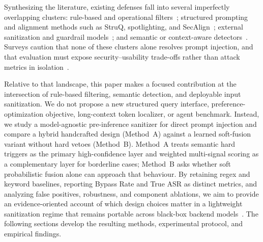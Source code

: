 Synthesizing the literature, existing defenses fall into several imperfectly overlapping clusters: rule-based and operational filters~\cite{openrouter2026promptinjection,getstream2024prompt,mend2024prompt}; structured prompting and alignment methods such as StruQ, spotlighting, and SecAlign~\cite{struq2024,hines2024spotlighting,secalign2024}; external sanitization and guardrail models~\cite{geng2025pisanitizer,shi2025promptarmor,chowdhury2025prepsilonepsilonmptsanitizingsensitiveprompts}; and semantic or context-aware detectors~\cite{wang2025promptsleuth,kholkar2025capture}.
Surveys caution that none of these clusters alone resolves prompt injection, and that evaluation must expose security--usability trade-offs rather than attack metrics in isolation~\cite{correia2026systematic,bair2025prompt,11359704,zizzo2025adversarial}.

Relative to that landscape, this paper makes a focused contribution at the intersection of rule-based filtering, semantic detection, and deployable input sanitization.
We do not propose a new structured query interface, preference-optimization objective, long-context token localizer, or agent benchmark.
Instead, we study a model-agnostic pre-inference sanitizer for direct prompt injection and compare a hybrid handcrafted design (Method~A) against a learned soft-fusion variant without hard vetoes (Method~B).
Method~A treats semantic hard triggers as the primary high-confidence layer and weighted multi-signal scoring as a complementary layer for borderline cases; Method~B asks whether soft probabilistic fusion alone can approach that behaviour.
By retaining regex and keyword baselines, reporting Bypass Rate and True ASR as distinct metrics, and analyzing false positives, robustness, and component ablations, we aim to provide an evidence-oriented account of which design choices matter in a lightweight sanitization regime that remains portable across black-box backend models~\cite{zizzo2025adversarial,bair2025prompt,correia2026systematic}.
The following sections develop the resulting methods, experimental protocol, and empirical findings.
